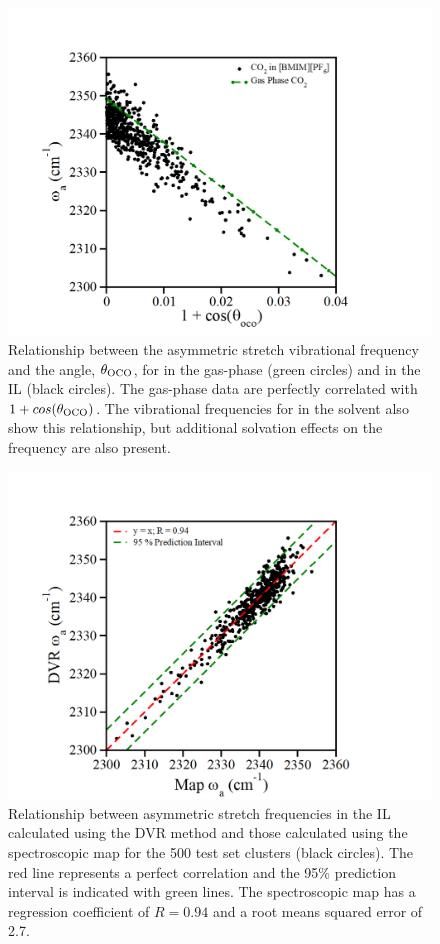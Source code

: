 \begin{figure}[h]
  \centering
  \includegraphics{paper_03/figure1.png}
  \caption{Relationship between the  asymmetric stretch vibrational frequency and the  angle, \(\theta_{\ce{OCO}}\), for  in the gas-phase (green circles) and in the \ce{[C4C1im][PF6]} IL (black circles). The gas-phase data are perfectly correlated with \(1 + cos(\theta_{\ce{OCO}})\). The vibrational frequencies for  in the \ce{[C4C1im][PF6]} solvent also show this relationship, but additional solvation effects on the frequency are also present.}
  \label{paper_03:fig1}
\end{figure}

\begin{figure}[h]
  \centering
  \includegraphics{paper_03/figure2.png}
  \caption[Spectroscopic map comparison with DVR]{Relationship between  asymmetric stretch frequencies in the \ce{[C4C1im][PF6]} IL calculated using the DVR method and those calculated using the spectroscopic map for the 500 test set clusters (black circles). The red line represents a perfect correlation and the 95\% prediction interval is indicated with green lines. The spectroscopic map has a regression coefficient of \(R = 0.94\) and a root means squared error of \SI{2.7}{\wavenumber}.}
  \label{paper_03:fig2}
\end{figure}


